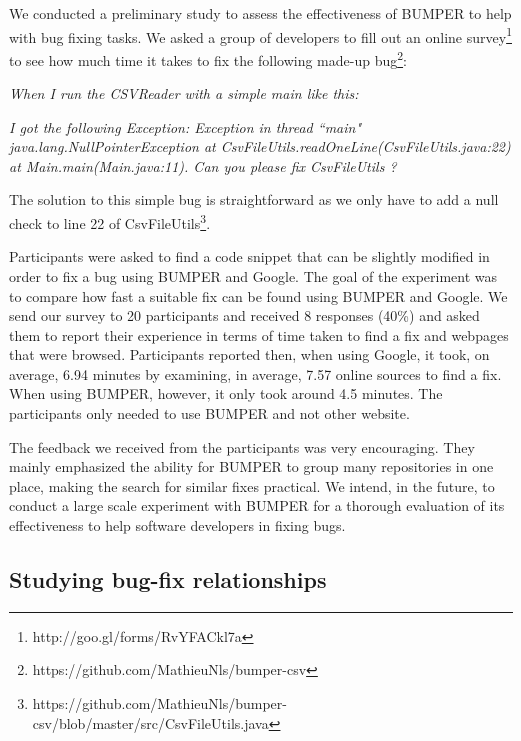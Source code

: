 \documentclass[conference]{IEEEtran}
\begin{document}
We conducted a preliminary study to assess the effectiveness of BUMPER to help with bug fixing tasks. We asked  a group of developers to fill out an online survey\footnote{http://goo.gl/forms/RvYFACkl7a} to see how much time it takes to fix the following made-up bug\footnote{https://github.com/MathieuNls/bumper-csv}:

\textit{When I run the CSVReader with a simple main like this:}

\noindent\begin{minipage}{0.90\linewidth}

 

\end{minipage}

\textit{I got the following Exception: Exception in thread ``main" java.lang.NullPointerException at CsvFileUtils.readOneLine(CsvFileUtils.java:22) at Main.main(Main.java:11). Can you please fix CsvFileUtils ?}


The solution to this simple bug is straightforward as we only have to add a null check to line 22 of CsvFileUtils\footnote{https://github.com/MathieuNls/bumper-csv/blob/master/src/CsvFileUtils.java}.

Participants were asked to find a code snippet that can be slightly modified in order to fix a bug using BUMPER and Google. The goal of the experiment was to compare how fast a suitable fix can be found using BUMPER and Google.
We send our survey to 20 participants and received 8 responses (40\%) and asked them to report their experience in terms of time taken to find a fix and webpages that were browsed.
Participants reported then, when using Google, it took, on average, 6.94 minutes by examining, in average, 7.57 online sources to find a fix.
When using BUMPER, however, it only took around 4.5 minutes. The participants only needed to use BUMPER and not other website.

The feedback we received from the participants was very encouraging. They mainly emphasized the ability for BUMPER to group many repositories in one place, making the search for similar fixes practical. We intend, in the future, to conduct a large scale experiment with BUMPER for a thorough evaluation of its effectiveness to help software developers in fixing bugs.

\subsection{Studying bug-fix relationships}
\label{subs:Studying bug-fix relationships}
\end{document}
